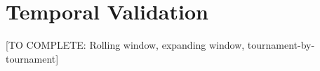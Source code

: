 \section{Temporal Validation}

[TO COMPLETE: Rolling window, expanding window, tournament-by-tournament]